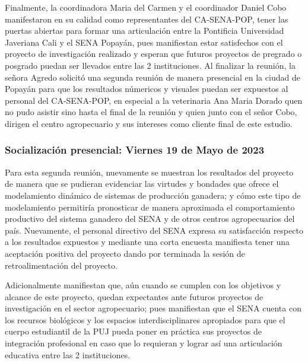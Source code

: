 Finalmente, la coordinadora Maria del Carmen y el coordinador Daniel Cobo manifestaron en su calidad como representantes del CA-SENA-POP, tener las puertas abiertas para formar una articulación entre la Pontificia Universidad Javeriana Cali y el SENA Popayán, pues manifiestan estar satisfechos con el proyecto de investigación realizado y esperan que futuros proyectos de pregrado o posgrado puedan ser llevados entre las 2 instituciones.
Al finalizar la reunión, la señora Agredo solicitó una segunda reunión de manera presencial en la ciudad de Popayán para que los resultados númericos y visuales puedan ser expuestos al personal del CA-SENA-POP, en especial a la veterinaria Ana Maria Dorado quen no pudo asistir sino hasta el final de la reunión y quien junto con el señor Cobo, dirigen el centro agropecuario y sus intereses como cliente final de este estudio.

\subsubsection{Socialización presencial: Viernes 19 de Mayo de 2023}

Para esta segunda reunión, nuevamente se muestran los resultados del proyecto de manera que se pudieran evidenciar las virtudes y bondades que ofrece el modelamiento dinámico de sistemas de producción ganadera; y cómo este tipo de modelamiento permitiría pronosticar de manera aproximada el comportamiento productivo del sistema ganadero del SENA y de otros centros agropecuarios del país. Nuevamente, el personal directivo del SENA expresa su satisfacción respecto a los resultados expuestos y mediante una corta encuesta manifiesta tener una aceptación positiva del proyecto dando por terminada la sesión de retroalimentación del proyecto.

Adicionalmente manifiestan que, aún cuando se cumplen con los objetivos y alcance de este proyecto, quedan expectantes ante futuros proyectos de investigación en el sector agropecuario; pues manifiestan que el SENA cuenta con los recursos biológicos y los espacios interdisciplinares apropiados para que el cuerpo estudiantil de la PUJ pueda poner en práctica sus proyectos de integración profesional en caso que lo requieran y lograr así una articulación educativa entre las 2 instituciones.
